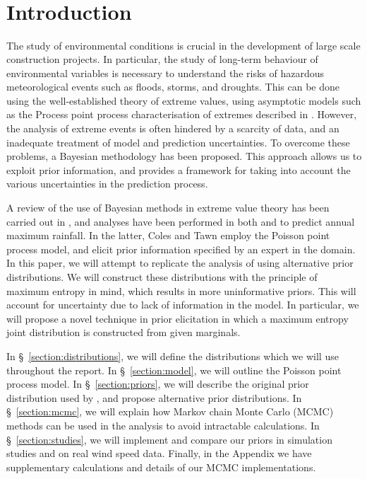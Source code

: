 \documentclass{article}
\title{%
	\vspace{-15mm}\Huge{\hwtitle}\\
	\Large\vspace{1mm}\hwname\\
	\Large\vspace{1mm}\small{\itshape\hwdate}\vspace{-15mm}}
\date{}
\author{}
\begin{document}
%	
\maketitle
%
\section{Introduction}
%

%
The study of environmental conditions is crucial
in the development of large scale construction projects.
In particular, the study of long-term behaviour
of environmental variables is necessary to understand
the risks of hazardous meteorological events such as
floods, storms, and droughts.
This can be done using the well-established theory of extreme values,
using asymptotic models such as the Process point process characterisation
of extremes described in \cite{coles2001}.
However, the analysis of extreme events is often hindered
by a scarcity of data, and an inadequate treatment
of model and prediction uncertainties.
To overcome these problems, a Bayesian methodology has been proposed.
This approach allows us to exploit prior information,
and provides a framework for taking into account the various uncertainties
in the prediction process.
%

%
A review of the use of Bayesian methods in extreme value theory
has been carried out in \cite{coles1996review},
and analyses have been performed in both \cite{coles2003} and \cite{coles1996}
to predict annual maximum rainfall.
In the latter, Coles and Tawn employ the Poisson point process model,
and elicit prior information specified by an expert in the domain.
In this paper, we will attempt to replicate the analysis of \cite{coles1996}
using alternative prior distributions.
We will construct these distributions with the principle
of maximum entropy in mind, which results in more uninformative priors.
This will account for uncertainty due to lack of information in the model.
In particular, we will propose a novel technique in prior elicitation
in which a maximum entropy joint distribution
is constructed from given marginals.
%

%
In \S~\ref{section:distributions}, we will define the distributions
which we will use throughout the report.
In \S~\ref{section:model}, we will outline the Poisson point process model.
In \S~\ref{section:priors}, we will describe the original prior distribution
used by \cite{coles1996}, and propose alternative prior distributions.
In \S~\ref{section:mcmc}, we will explain how Markov chain Monte Carlo (MCMC)
methods can be used in the analysis to avoid intractable calculations.
In \S~\ref{section:studies}, we will implement and compare our priors
in simulation studies and on real wind speed data.
Finally, in the Appendix we have supplementary calculations
and details of our MCMC implementations.
%
\end{document}
